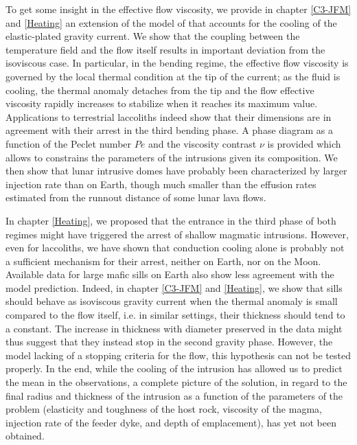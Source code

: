 To get  some insight in  the effective  flow viscosity, we  provide in
chapter \ref{C3-JFM}  and \ref{Heating} an  extension of the  model of
\citet{Michaut:2011kg}   that  accounts   for  the   cooling  of   the
elastic-plated gravity current.  We show that the coupling between the
temperature field and  the flow itself results  in important deviation
from the  isoviscous case. In  particular, in the bending  regime, the
effective flow viscosity is governed by the local thermal condition at
the tip of  the current; as the fluid is  cooling, the thermal anomaly
detaches  from  the  tip  and the  flow  effective  viscosity  rapidly
increases   to  stabilize   when   it  reaches   its  maximum   value.
Applications  to   terrestrial  laccoliths  indeed  show   that  their
dimensions are  in agreement  with their arrest  in the  third bending
phase.  A  phase diagram as a  function of the Peclet  number $Pe$ and
the viscosity  contrast $\nu$ is  provided which allows  to constrains
the parameters of the intrusions  given its composition.  We then show
that lunar intrusive domes have  probably been characterized by larger
injection rate  than on Earth,  though much smaller than  the effusion
rates estimated from the runnout distance of some lunar lava flows.

In chapter \ref{Heating},  we proposed that the entrance  in the third
phase  of both  regimes might  have  triggered the  arrest of  shallow
magmatic intrusions.  However, even for laccoliths, we have shown that
conduction cooling  alone is probably  not a sufficient  mechanism for
their arrest,  neither on Earth, nor  on the Moon. Available  data for
large mafic  sills on Earth  also show  less agreement with  the model
prediction.   Indeed, in  chapter \ref{C3-JFM}  and \ref{Heating},  we
show that sills  should behave as isoviscous gravity  current when the
thermal anomaly is small compared to the flow itself, i.e.  in similar
settings, their thickness should tend  to a constant.  The increase in
thickness with diameter preserved in  the data might thus suggest that
they  instead stop  in the  second gravity  phase. However,  the model
lacking of a  stopping criteria for the flow, this  hypothesis can not
be tested properly. In the end, while the cooling of the intrusion has
allowed us to predict the mean in the observations, a complete picture
of the  solution, in regard to  the final radius and  thickness of the
intrusion as a  function of the parameters of  the problem (elasticity
and toughness of the host rock, viscosity of the magma, injection rate
of  the feeder  dyke,  and depth  of emplacement),  has  yet not  been
obtained.

